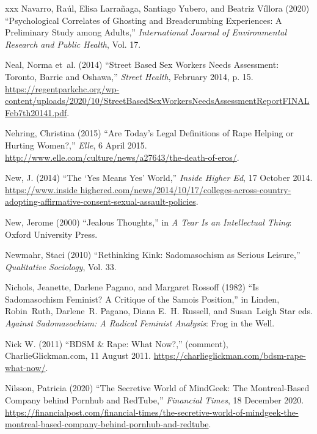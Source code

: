 \documentclass[]{jlreq} \usepackage{mystyle}
\begin{document}
\begin{thebibliography}{xxx}
Navarro, Raúl, Elisa Larrañaga, Santiago Yubero, and Beatriz Víllora (2020)
  ``Psychological Correlates of Ghosting and Breadcrumbing Experiences: A
  Preliminary Study among Adults,'' \textit{ International Journal of
  Environmental Research and Public Health}, Vol. 17.

Neal, Norma et~al. (2014) ``Street Based Sex Workers Needs Assessment: Toronto,
  Barrie and Oshawa,'' \emph{Street Health}, February 2014, p. 15.
  \url{https://regentparkchc.org/wp-content/uploads/2020/10/StreetBasedSexWorkersNeedsAssessmentReportFINALFeb7th20141.pdf}.

Nehring, Christina (2015) ``Are Today's Legal Definitions of Rape Helping or
  Hurting Women?,'' \emph{Elle}, 6 April 2015.
  \url{http://www.elle.com/culture/news/a27643/the-death-of-eros/}.

New, J. (2014) ``The `Yes Means Yes' World,'' \emph{Inside Higher Ed}, 17
  October 2014. \url{https://www.inside
  highered.com/news/2014/10/17/colleges-across-country-adopting-affirmative-consent-sexual-assault-policies}.

New, Jerome (2000) ``Jealous Thoughts,'' in  \textit{ A Tear Is an Intellectual
  Thing}: Oxford University Press.

Newmahr, Staci (2010) ``Rethinking Kink: Sadomasochism as Serious Leisure,''
  \textit{ Qualitative Sociology}, Vol. 33.

Nichols, Jeanette, Darlene Pagano, and Margaret Rossoff (1982) ``Is
  Sadomasochism Feminist? A Critique of the Samois Position,'' in Linden,
  Robin~Ruth, Darlene~R. Pagano, Diana E.~H. Russell, and Susan~Leigh Star eds.
    \textit{ Against Sadomasochism: A Radical Feminist Analysis}: Frog in the
  Well.

{Nick W.} (2011) ``BDSM \& Rape: What Now?,'' (comment), CharlieGlickman.com,
  11 August 2011. \url{https://charlieglickman.com/bdsm-rape-what-now/}.

Nilsson, Patricia (2020) ``The Secretive World of MindGeek: The Montreal-Based
  Company behind Pornhub and RedTube,'' \emph{Financial Times}, 18 December
  2020.
  \url{https://financialpost.com/financial-times/the-secretive-world-of-mindgeek-the-montreal-based-company-behind-pornhub-and-redtube}.


\end{thebibliography}
\end{document}
